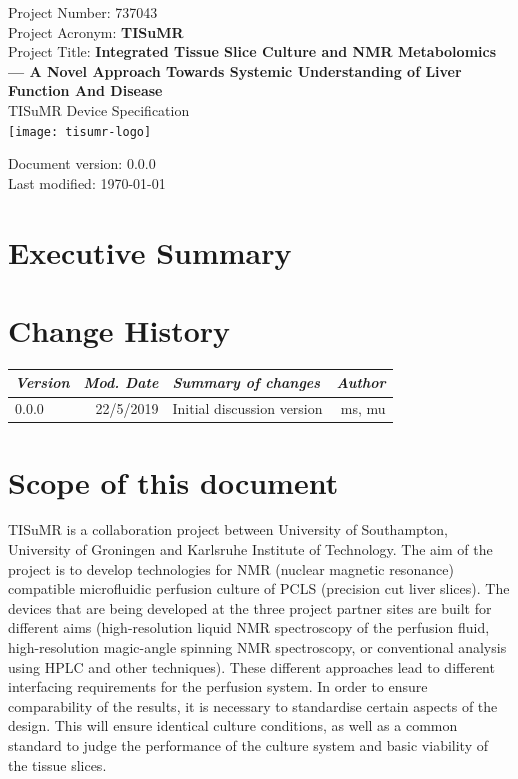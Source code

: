 \documentclass{EU-report}
\begin{document}
\begin{center}
\vfill
Project Number: 737043\\[1cm]
Project Acronym: \textbf{TISuMR}\\[1cm]
Project Title: \textbf{Integrated Tissue Slice Culture and NMR Metabolomics
  --- A Novel Approach Towards Systemic Understanding of Liver Function And Disease}\\
\vfill
{\Huge TISuMR Device Specification\\}
\vfill
\texttt{[image: tisumr-logo]}
\end{center}
\vfill
Document version: 0.0.0 \\
Last modified: \today
\vspace{1cm}

\clearpage
\section{Executive Summary}

\section{Change History}
\begin{center}
	\begin{tabular}{lrp{7cm}r} \hline\hline
		\emph{Version} & \emph{Mod. Date} & \emph{Summary of changes} & \emph{Author} \\
		\hline
		0.0.0 & 22/5/2019 & Initial discussion version & ms, mu\\
		\hline\hline
	\end{tabular}
\end{center}
\clearpage


\section{Scope of this document}
TISuMR is a collaboration project between University of Southampton, University
of Groningen and Karlsruhe Institute of Technology. The aim of the project is to
develop technologies for NMR (nuclear magnetic resonance) compatible
microfluidic perfusion culture of PCLS (precision cut liver slices).
The devices that are being developed at the three project partner sites
are built for different aims (high-resolution liquid NMR spectroscopy of the
perfusion fluid, high-resolution magic-angle spinning NMR spectroscopy,
or conventional analysis using HPLC and other techniques). These different
approaches lead to different interfacing requirements for the perfusion system.
In order to ensure comparability of the results, it is necessary to standardise
certain aspects of the design. This will ensure identical culture conditions,
as well as a common standard to judge the performance of the culture
system and basic viability of the tissue slices.
\end{document}
